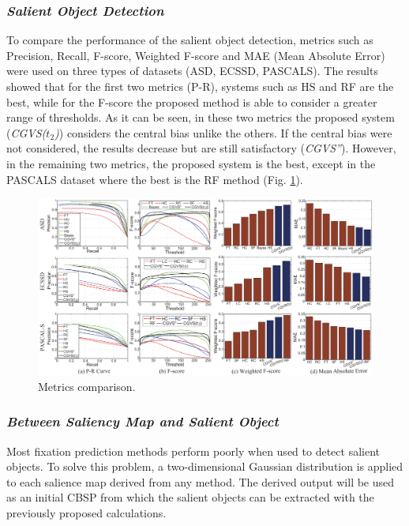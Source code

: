 \subsubsection{\emph{Salient Object Detection}}
To compare the performance of the salient object detection, metrics such 
as Precision, Recall, F-score, Weighted F-score and MAE (Mean Absolute 
Error) were used on three types of datasets (ASD, ECSSD, PASCALS). The 
results showed that for the first two metrics (P-R), systems such as HS and 
RF are the best, while for the F-score the proposed method is able to consider 
a greater range of thresholds. As it can be seen, in these two metrics the 
proposed system (\emph{CGVS($ t_2 $)}) considers the central bias unlike the others. 
If the central bias were not considered, the results decrease but are still 
satisfactory (\emph{CGVS''}). However, in the remaining two metrics, the proposed 
system is the best, except in the PASCALS dataset where the best is the RF 
method (Fig. \ref{fig: metrics}).
\begin{figure}[htbp]
    \centering
    \includegraphics[width = 1 \linewidth]{images/paper1/metrics.png}
    \centering
    \caption{Metrics comparison.}
    \label{fig: metrics}
\end{figure}

\subsubsection{\emph{Between Saliency Map and Salient Object}}
Most fixation prediction methods perform poorly when used to detect salient 
objects. To solve this problem, a two-dimensional Gaussian distribution is 
applied to each salience map derived from any method. The derived output 
will be used as an initial CBSP from which the salient objects can be 
extracted with the previously proposed calculations. 

